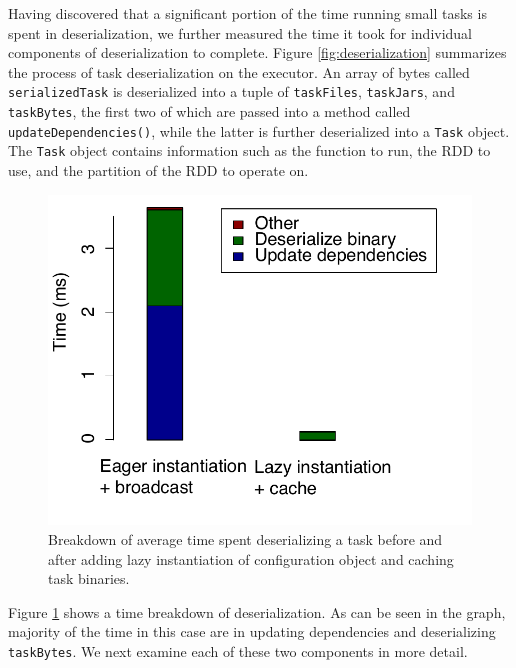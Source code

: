 Having discovered that a significant portion of the time running small tasks is spent in deserialization, we further measured the time it took for individual components of deserialization to complete. Figure \ref{fig:deserialization} summarizes the process of task deserialization on the executor. An array of bytes called \texttt{serializedTask} is deserialized into a tuple of \texttt{taskFiles}, \texttt{taskJars}, and \texttt{taskBytes}, the first two of which are passed into a method called \texttt{updateDependencies()}, while the latter is further deserialized into a \texttt{Task} object. The \texttt{Task} object contains information such as the function to run, the RDD to use, and the partition of the RDD to operate on.

\begin{figure}[t!]
 \begin{center}
   \includegraphics[scale=0.60]{images_graphs/optimizations/graph2/task_deser_micro.pdf}
 \end{center}
 \caption{Breakdown of average time spent deserializing a task before and after adding lazy instantiation of configuration object and caching task binaries.}
 \label{fig:deserialization_times}
\end{figure}

Figure \ref{fig:deserialization_times} shows a time breakdown of deserialization. As can be seen in the graph, majority of the time in this case are in updating dependencies and deserializing \texttt{taskBytes}. We next examine each of these two components in more detail.

